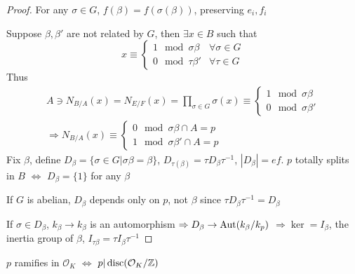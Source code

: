 \documentclass[../main.tex]{subfiles}
\begin{document}
\begin{proof}
For any $\sigma\in G$, $f(\beta)=f(\sigma(\beta))$, preserving $e_i,f_i$
\begin{center}
\end{center}
Suppose $\beta,\beta'$ are not related by $G$, then $\exists x\in B$ such that
\[x\equiv\begin{cases}
1\mod\sigma\beta &\forall \sigma\in G \\
0\mod\tau\beta' &\forall \tau\in G
\end{cases}\]
Thus
\begin{align*}
A\ni N_{B/A}(x)=N_{E/F}(x)=\prod_{\sigma\in G}\sigma(x)\equiv\begin{cases}
1\mod\sigma\beta \\
0\mod\sigma\beta'
\end{cases} \\
\Rightarrow N_{B/A}(x)\equiv\begin{cases}
0\mod\sigma\beta\cap A=p \\
1\mod\sigma\beta'\cap A=p
\end{cases}
\end{align*}
Fix $\beta$, define $D_\beta=\{\sigma\in G|\sigma\beta=\beta\}$, $D_{\tau(\beta)}=\tau D_{\beta}\tau^{-1}$, $|D_\beta|=ef$. $p$ totally splits in $B$ $\Leftrightarrow$ $D_\beta=\{1\}$ for any $\beta$ \par
If $G$ is abelian, $D_\beta$ depends only on $p$, not $\beta$ since $\tau D_{\beta}\tau^{-1}=D_\beta$
\begin{center}
\end{center}
If $\sigma\in D_\beta$, $k_\beta\to k_\beta$ is an automorphism $\Rightarrow D_\beta\to \operatorname{Aut}(k_\beta/k_p)$ $\Rightarrow \ker=I_\beta$, the inertia group of $\beta$, $I_{\tau\beta}=\tau I_\beta\tau^{-1}$
\end{proof}

\begin{theorem}
$p$ ramifies in $\mathcal O_K$ $\Leftrightarrow$ $p|\operatorname{disc}(\mathcal O_K/\mathbb Z)$
\end{theorem}
\end{document}
